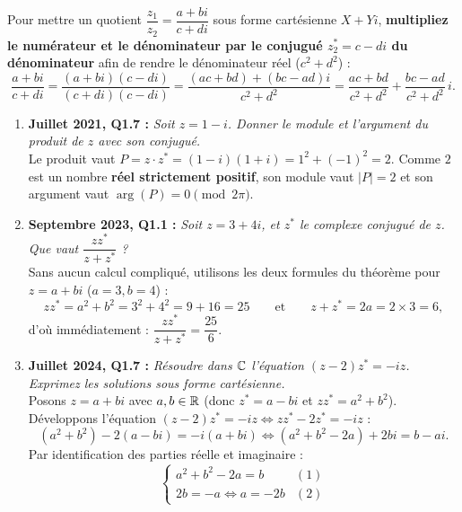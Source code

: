 \begin{astuce}
Pour mettre un quotient $\dfrac{z_1}{z_2} = \dfrac{a + bi}{c + di}$ sous forme cartésienne $X + Yi$, \textbf{multipliez le numérateur et le dénominateur par le conjugué $z_2^* = c - di$ du dénominateur} afin de rendre le dénominateur réel ($c^2 + d^2$) :
\[
    \boxed{\frac{a + bi}{c + di} = \frac{(a + bi)(c - di)}{(c + di)(c - di)} = \frac{(ac + bd) + (bc - ad)i}{c^2 + d^2} = \frac{ac + bd}{c^2 + d^2} + \frac{bc - ad}{c^2 + d^2}\,i}.
\]
\end{astuce}

\begin{exemple}
\begin{enumerate}
    \item \textbf{Juillet 2021, Q1.7 :} \emph{Soit $z = 1 - i$. Donner le module et l'argument du produit de $z$ avec son conjugué.}\\
    Le produit vaut $P = z \cdot z^* = (1 - i)(1 + i) = 1^2 + (-1)^2 = 2$. Comme $2$ est un nombre \textbf{réel strictement positif}, son module vaut $\boxed{|P| = 2}$ et son argument vaut $\boxed{\arg(P) = 0 \pmod{2\pi}}$.
    \item \textbf{Septembre 2023, Q1.1 :} \emph{Soit $z = 3 + 4i$, et $z^*$ le complexe conjugué de $z$. Que vaut $\dfrac{z z^*}{z + z^*}$ ?}\\
    Sans aucun calcul compliqué, utilisons les deux formules du théorème pour $z = a + bi$ ($a = 3, b = 4$) :
    \[
        z z^* = a^2 + b^2 = 3^2 + 4^2 = 9 + 16 = 25 \qquad \text{et} \qquad z + z^* = 2a = 2 \times 3 = 6,
    \]
    d'où immédiatement : $\dfrac{z z^*}{z + z^*} = \boxed{\dfrac{25}{6}}$.
    \item \textbf{Juillet 2024, Q1.7 :} \emph{Résoudre dans $\mathbb{C}$ l'équation $(z - 2)z^* = -iz$. Exprimez les solutions sous forme cartésienne.}\\
    Posons $z = a + bi$ avec $a, b \in \mathbb{R}$ (donc $z^* = a - bi$ et $z z^* = a^2 + b^2$). Développons l'équation $(z - 2)z^* = -iz \iff z z^* - 2z^* = -iz$ :
    \[
        (a^2 + b^2) - 2(a - bi) = -i(a + bi) \iff (a^2 + b^2 - 2a) + 2bi = b - ai.
    \]
    Par identification des parties réelle et imaginaire :
    \[
        \begin{cases} a^2 + b^2 - 2a = b & (1) \\ 2b = -a \iff a = -2b & (2) \end{cases}
\]
\end{enumerate}
\end{exemple}

